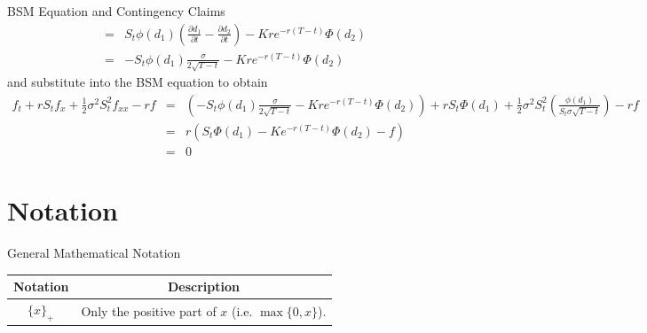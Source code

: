 \documentclass[11pt,a4paper]{article}
\begin{document}
\begin{example}{BSM Equation and Contingency Claims}
\[\begin{array}{rcl}
      &=&S_t\phi(d_1)\left(\frac{\partial d_1}{\partial t}-\frac{\partial d_2}{\partial t}\right)-Kre^{-r(T-t)}\Phi(d_2)\\
      &=&-S_t\phi(d_1)\frac{\sigma}{2\sqrt{T-t}}-Kre^{-r(T-t)}\Phi(d_2)
    \end{array}\]
    and substitute into the BSM equation to obtain
    \[\begin{array}{rcl}
      f_t+rS_tf_x+\frac12\sigma^2S_t^2f_{xx}-rf&=&\left(-S_t\phi(d_1)\frac{\sigma}{2\sqrt{T-t}}-Kre^{-r(T-t)}\Phi(d_2)\right)+rS_t\Phi(d_1)+\frac12\sigma^2S_t^2\left(\frac{\phi(d_1)}{S_t\sigma\sqrt{T-t}}\right)-rf\\
      &=&r\left(S_t\Phi(d_1)-Ke^{-r(T-t)}\Phi(d_2)-f\right)\\
      &=&0
    \end{array}\]
  \end{example}

\section{Notation}

  \begin{notation}{General Mathematical Notation}
    \begin{tabular}{c|c}
      Notation&Description\\\hline
      $\{x\}_+$&Only the positive part of $x$ (i.e. $\max\{0,x\}$).
    \end{tabular}
  \end{notation}
\end{document}
